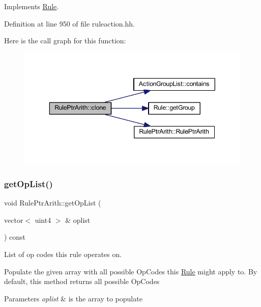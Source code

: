 Implements \mbox{\hyperlink{class_rule_a70de90a76461bfa7ea0b575ce3c11e4d}{Rule}}.



Definition at line 950 of file ruleaction.\+hh.

Here is the call graph for this function\+:
\nopagebreak
\begin{figure}[H]
\begin{center}
\leavevmode
\includegraphics[width=343pt]{class_rule_ptr_arith_afe0c04cbed0b86e6c09ca29f4514531f_cgraph}
\end{center}
\end{figure}
\mbox{\label{class_rule_ptr_arith_a1671af63d66f70ec2746887d32dfa46e}} 
\subsubsection{\texorpdfstring{getOpList()}{getOpList()}}
{\footnotesize\ttfamily void Rule\+Ptr\+Arith\+::get\+Op\+List (\begin{DoxyParamCaption}\item[{vector$<$ uint4 $>$ \&}]{oplist }\end{DoxyParamCaption}) const\hspace{0.3cm}{\ttfamily [virtual]}}



List of op codes this rule operates on. 

Populate the given array with all possible Op\+Codes this \mbox{\hyperlink{class_rule}{Rule}} might apply to. By default, this method returns all possible Op\+Codes 
\begin{DoxyParams}{Parameters}
{\em oplist} & is the array to populate \\
\hline
\end{DoxyParams}


